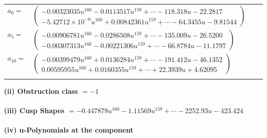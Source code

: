 \documentclass[1p]{elsarticle_modified}
\theoremstyle{definition}
\begin{document}
\begin{tabular}{m{7pt} m{180pt} m{7pt} m{180pt} }
\flushright $a_{6}=$&$\begin{pmatrix}-0.00323035 u^{160}-0.0113517 u^{159}+\cdots-118.318 u-22.2817\\-5.42712\times10^{-6} u^{160}+0.00842361 u^{159}+\cdots-64.3455 u-9.81544\end{pmatrix}$ \\
\flushright $a_{5}=$&$\begin{pmatrix}-0.00906781 u^{160}-0.0286508 u^{159}+\cdots-135.009 u-26.5200\\-0.00307313 u^{160}-0.00221306 u^{159}+\cdots-66.8784 u-11.1797\end{pmatrix}$ \\
\flushright $a_{10}=$&$\begin{pmatrix}-0.00399479 u^{160}+0.0136284 u^{159}+\cdots-191.412 u-46.1352\\0.00595955 u^{160}+0.0160355 u^{159}+\cdots+22.3939 u+4.62095\end{pmatrix}$\\&\end{tabular}
\flushleft \textbf{(ii) Obstruction class $= -1$}\\~\\
\flushleft \textbf{(iii) Cusp Shapes $= -0.447878 u^{160}-1.11569 u^{159}+\cdots-2252.93 u-423.424$}\\~\\
\newpage\renewcommand{\arraystretch}{1}
\flushleft \textbf{(iv) u-Polynomials at the component}\newline \\
\end{document}
